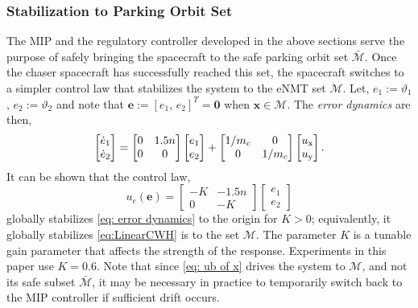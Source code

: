 \documentclass[twocolumn,letterpaper]{IEEEAerospaceCLS}  %
\theoremstyle{definition}
\begin{document}
\subsubsection{Stabilization to Parking Orbit Set}
The MIP and the regulatory controller developed in the above sections serve the purpose of safely bringing the spacecraft to the safe parking orbit set $\bar{{\mathcal{M}}}$. 
Once the chaser spacecraft has successfully reached this set, the spacecraft switches to a simpler control law that stabilizes the system to the eNMT set ${\mathcal{M}}$. 
Let, $e_1 := \vartheta_1$, $e_2 := \vartheta_2$
and note that $\boldsymbol{e}:=[e_1, \,e_2]^T=\boldsymbol{0} $ when $ \boldsymbol{x}\in {\mathcal{M}}$. 
The \textit{error dynamics} are then, 
\begin{equation}\label{eq: error dynamics}
  \begin{bmatrix}
  \dot{e}_1 \\
  \dot{e}_2
  \end{bmatrix}
  = 
  \begin{bmatrix}
   0 & 1.5 n \\ 
   0 & 0 
  \end{bmatrix}
  \begin{bmatrix}
   e_1 \\ 
   e_2 
  \end{bmatrix}
  + 
    \begin{bmatrix}
   1/m_c & 0 \\
   0 & 1/m_c
  \end{bmatrix}
  \begin{bmatrix}
   u_{\rm x} \\ 
   u_{\rm y} 
  \end{bmatrix}.
\end{equation}
It can be shown that the control law, 
\begin{equation} \label{eq: ub of x}
  u_e(\boldsymbol{e}) = 
  \begin{bmatrix}
  -K & -1.5n \\ 
  0 & -K 
  \end{bmatrix}
  \begin{bmatrix}
   e_1 \\ 
   e_2 
  \end{bmatrix}
\end{equation}
globally stabilizes \eqref{eq: error dynamics} to the origin for $K>0$; equivalently, it globally stabilizes \eqref{eq:LinearCWH} is to the set ${\mathcal{M}}$. 
The parameter $K$ is a tunable gain parameter that affects the strength of the response. Experiments in this paper use $K=0.6$.
Note that since \eqref{eq: ub of x} drives the system to ${\mathcal{M}}$, and not its safe subset $\bar{{\mathcal{M}}}$,
it may be necessary in practice to temporarily switch back to the MIP controller if sufficient drift occurs. 
\end{document}
